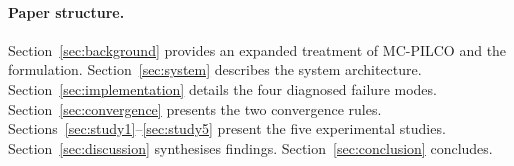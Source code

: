 \paragraph{Paper structure.}
Section~\ref{sec:background} provides an expanded treatment of MC-PILCO and the
\mcpilot{} formulation.
Section~\ref{sec:system} describes the system architecture.
Section~\ref{sec:implementation} details the four diagnosed failure modes.
Section~\ref{sec:convergence} presents the two convergence rules.
Sections~\ref{sec:study1}--\ref{sec:study5} present the five experimental studies.
Section~\ref{sec:discussion} synthesises findings.
Section~\ref{sec:conclusion} concludes.
